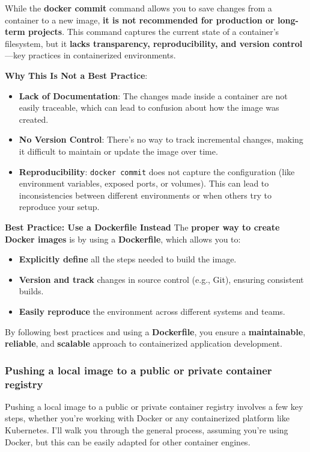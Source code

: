 \documentclass{article}
\newenvironment{blocktemplateIII}[1]{%
    \tcolorbox[beamer,%
    noparskip,breakable,
    ,colframe=Red,%
    colbacklower=LimeGreen!75!LightGreen,%
    title=#1]}%
    {\endtcolorbox}
\begin{document}
\begin{blocktemplateIII}{WARNING}
While the \textbf{docker commit} command allows you to save changes from a container to a new image, \textbf{it is not recommended for production or long-term projects}. This command captures the current state of a container's filesystem, but it \textbf{lacks transparency, reproducibility, and version control}—key practices in containerized environments.

\textbf{Why This Is Not a Best Practice}:
\begin{itemize} 
    \item \textbf{Lack of Documentation}: The changes made inside a container are not easily traceable, which can lead to confusion about how the image was created. 
    \item \textbf{No Version Control}: There's no way to track incremental changes, making it difficult to maintain or update the image over time. 
    \item \textbf{Reproducibility}: \verb|docker commit| does not capture the configuration (like environment variables, exposed ports, or volumes). This can lead to inconsistencies between different environments or when others try to reproduce your setup. 
\end{itemize}

\textbf{Best Practice: Use a Dockerfile Instead}
The \textbf{proper way to create Docker images} is by using a \textbf{Dockerfile}, which allows you to: 
\begin{itemize} 
    \item \textbf{Explicitly define} all the steps needed to build the image. 
    \item \textbf{Version and track} changes in source control (e.g., Git), ensuring consistent builds. 
    \item \textbf{Easily reproduce} the environment across different systems and teams. 
\end{itemize}

By following best practices and using a \textbf{Dockerfile}, you ensure a \textbf{maintainable}, \textbf{reliable}, and \textbf{scalable} approach to containerized application development.
\end{blocktemplateIII}

\subsubsection{Pushing a local image to a public or private container registry}
Pushing a local image to a public or private container registry involves a few key steps, whether you're working with Docker or any containerized platform like Kubernetes. I'll walk you through the general process, assuming you're using Docker, but this can be easily adapted for other container engines.
\end{document}

